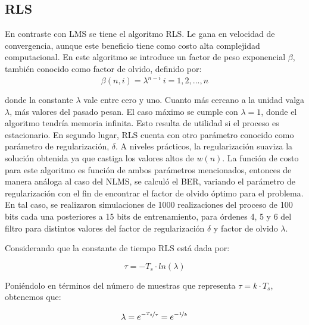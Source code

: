 \documentclass[main.tex]{subfiles}
\begin{document}
\subsection*{RLS}
En contraste con LMS se tiene el algoritmo RLS. Le gana en velocidad de convergencia, aunque este beneficio tiene como costo alta complejidad computacional.\newline
En este algoritmo se introduce un factor de peso exponencial $\beta$, también conocido como factor de olvido, definido por:
\begin{equation}
	\beta(n,i) = \lambda^{n-i} \: i=1,2,...,n
\end{equation}

donde la constante $\lambda$ vale entre cero y uno. Cuanto más cercano a la unidad valga $\lambda$, más valores
del pasado pesan. El caso máximo se cumple con $\lambda=1$, donde el algoritmo tendría memoria infinita. Esto resulta de 
utilidad si el proceso es estacionario.\newline
En segundo lugar, RLS cuenta con otro parámetro conocido como parámetro de regularización, $\delta$. A niveles prácticos, la regularización
suaviza la solución obtenida ya que castiga los valores altos de $w(n)$.
La función de costo para este algoritmo es función de ambos parámetros mencionados, entonces de manera análoga al caso del NLMS, se calculó el 
BER, variando el parámetro de regularización con el fin de encontrar el factor de olvido óptimo para el problema. 
En tal caso, se realizaron simulaciones de 1000 realizaciones del proceso de 100 bits cada una posteriores a 15 bits de entrenamiento,
 para órdenes 4, 5 y 6  del filtro para distintos valores del factor de regularización $\delta$ y factor de olvido $\lambda$. 

Considerando que la constante de tiempo RLS está dada por:

\begin{equation}
	\tau = -T_s \cdot ln(\lambda)
\end{equation}

Poniéndolo en términos del número de muestras que representa $\tau = k \cdot T_s$, obtenemos que:

\begin{equation}
	\lambda = e^{-\nicefrac{T_s}{\tau}} = e^{-\nicefrac{1}{k}}
\end{equation}
\end{document}
